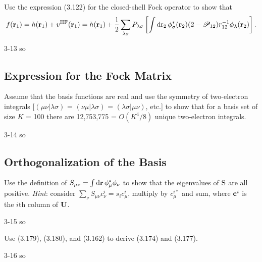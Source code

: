 \documentclass[a4paper]{book}
\newcommand*{\dif}{\mathop{}\!\mathrm{d}}
\newcommand{\HF}{{\rm HF}}
\newcommand{\U}{{\bf U}}
\begin{document}
	\begin{exercise}
	Use the expression (3.122) for the closed-shell Fock operator to show that
	\[
		f({\bf r}_1) = h({\bf r}_1) + v^\HF( {\bf r}_1 ) = h({\bf r}_1) + \frac{1}{2} \sum_{\lambda\sigma} P_{\lambda\sigma} \left[ \int \dif {\rm r}_2 \, \phi^*_\sigma( {\bf r}_2 ) ( 2 - \mathscr{P}_{12} ) r^{-1}_{12} \phi_\lambda( {\bf r}_2 ) \right].
	\]
	\end{exercise}
	
	\begin{solution}
		3-13 so
	\end{solution}
	
	\subsection{Expression for the Fock Matrix}
	
	\begin{exercise}
	Assume that the basis functions are real and use the symmetry of two-electron integrals [$(\mu\nu|\lambda\sigma)$ = $(\nu\mu|\lambda\sigma)$ = $(\lambda\sigma|\mu\nu)$, etc.] to show that for a basis set of size $K$ = 100 there are 12,753,775 = $O(K^4/8)$ unique two-electron integrals.
	\end{exercise}
	
	\begin{solution}
		3-14 so
	\end{solution}
	
	\subsection{Orthogonalization of the Basis}
	
	\begin{exercise}
	Use the definition of $S_{\mu\nu} = \int \dif {\bf r} \, \phi^*_\mu \phi_\nu$ to show that the eigenvalues of ${\rm S}$ are all positive. {\it Hint}: consider $\sum_\nu S_{\mu\nu} c^i_\nu = s_i c^i_\mu$, multiply by $c^{i*}_\mu$ and sum, where ${\bf c}^i$ is the $i$th column of $\U$.
	\end{exercise}
	
	\begin{solution}
		3-15 so
	\end{solution}
	
	\begin{exercise}
	Use (3.179), (3.180), and (3.162) to derive (3.174) and (3.177).
	\end{exercise}
	
	\begin{solution}
		3-16 so
	\end{solution}
\end{document}
